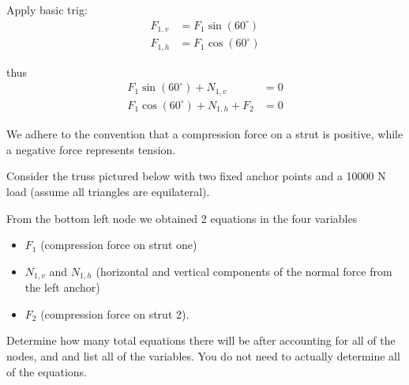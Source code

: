 \begin{applicationActivities}{2}{4}
\begin{observation}
\begin{multicols}{4}
Apply basic trig:
\begin{align*}
F_{1,v}&=F_1 \sin(60^\circ) \\ F_{1,h}&=F_1\cos(60^\circ)
\end{align*} 

thus
\begin{align*}
F_1 \sin(60^\circ)+N_{1,v} &= 0 \\
F_1 \cos(60^\circ)+N_{1,h}+F_2 &= 0 
\end{align*}
\end{multicols}

We adhere to the convention that a compression force on a strut is positive, while a negative force represents tension.
\end{observation}

\begin{activity}{10}
Consider the truss pictured below with two fixed anchor points and a 10000 N load (assume all triangles are equilateral).
\drawtruss

From the bottom left node we obtained 2 equations in the four variables 
\begin{itemize}
\item $F_{1}$ (compression force on strut one)
\item $N_{1,v}$ and $N_{1,h}$ (horizontal and vertical components of the normal force from the left anchor)
\item $F_2$ (compression force on strut 2).
\end{itemize}

\begin{subactivity}
Determine how many total equations there will be after accounting for all of the nodes, and and list all of the variables.  You do not need to actually determine all of the equations.
\end{subactivity}
\end{activity}



\end{applicationActivities}
